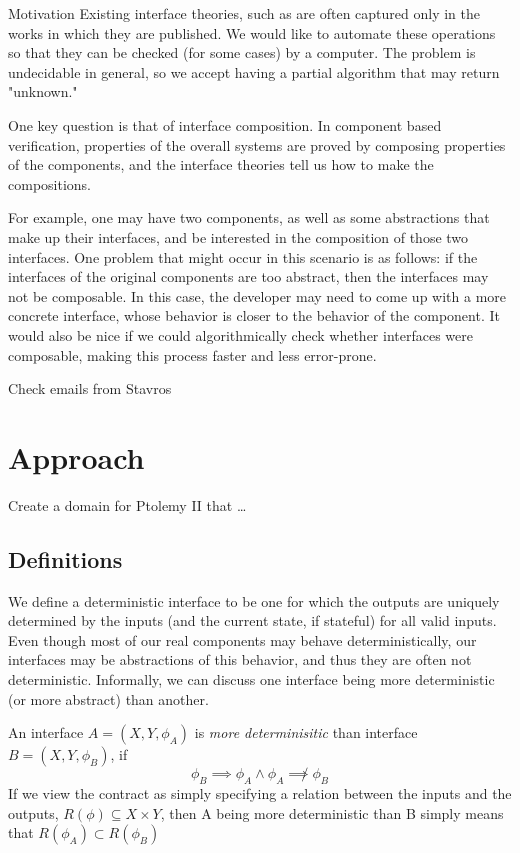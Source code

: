 \documentclass[preprint,11pt,authoryear]{sigplanconf}
\begin{document}
Motivation
Existing interface theories, such as {} are often captured only in the works in which they are published.  We would like to automate these operations so that they can be checked (for some cases) by a computer.  The problem is undecidable in general, so we accept having a partial algorithm that may return "unknown."

One key question is that of interface composition.  In component based verification, properties of the overall systems are proved by composing properties of the components, and the interface theories tell us how to make the compositions.

For example, one may have two components, as well as some abstractions that make up their interfaces, and be interested in the composition of those two interfaces.  One problem that might occur in this scenario is as follows: if the interfaces of the original components are too abstract, then the interfaces may not be composable.  In this case, the developer may need to come up with a more concrete interface, whose behavior is closer to the behavior of the component.  It would also be nice if we could algorithmically check whether interfaces were composable, making this process faster and less error-prone.

\cite{realationalInterfaces}
Check emails from Stavros
\section{Approach}
Create a domain for Ptolemy II that \dots

\subsection{Definitions}
We define a deterministic interface to be one for which the outputs are uniquely determined by the inputs (and the current state, if stateful) for all valid inputs.  Even though most of our real components may behave deterministically, our interfaces may be abstractions of this behavior, and thus they are often not deterministic.  Informally, we can discuss one interface being more deterministic (or more abstract) than another.

An interface $A=(X,Y,\phi_A)$ is \emph{more determinisitic} than interface $B=(X,Y,\phi_B)$, if
\[
\phi_B \implies \phi_A \wedge \phi_A \not\implies \phi_B
\]
If we view the contract as simply specifying a relation between the inputs and the outputs, $R(\phi) \subseteq X \times Y$, then A being more deterministic than B simply means that
$R(\phi_A) \subset R(\phi_B)$
\end{document}
